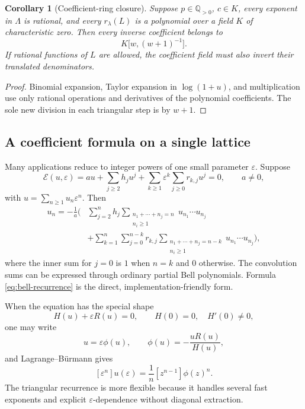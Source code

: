 \documentclass[11pt]{article}
\newtheorem{corollary}[theorem]{Corollary}
\theoremstyle{definition}
\theoremstyle{remark}
\newcommand{\Q}{\mathbb Q}
\newcommand{\calE}{\mathcal E}
\begin{document}
\begin{corollary}[Coefficient-ring closure]\label{cor:coefficient-ring}
Suppose \(p\in\Q_{>0}\), \(c\in K\), every exponent in \(\Lambda\) is rational, and every
\(r_\lambda(L)\) is a polynomial over a field \(K\) of characteristic zero.  Then every inverse coefficient belongs to
\[
 K\bigl[w,(w+1)^{-1}\bigr].
\]
If rational functions of \(L\) are allowed, the coefficient field must also invert their translated denominators.
\end{corollary}

\begin{proof}
Binomial expansion, Taylor expansion in \(\log(1+u)\), and multiplication use only rational operations and derivatives of the polynomial coefficients.  The sole new division in each triangular step is by \(w+1\).
\end{proof}

\subsection{A coefficient formula on a single lattice}

Many applications reduce to integer powers of one small parameter \(\varepsilon\).  Suppose
\begin{equation}\label{eq:single-lattice-E}
 \calE(u,\varepsilon)
 =a u+\sum_{j\ge2}h_j u^j
 +\sum_{k\ge1}\varepsilon^k\sum_{j\ge0}r_{k,j}u^j=0,
 \qquad a\ne0,
\end{equation}
with \(u=\sum_{n\ge1}u_n\varepsilon^n\).  Then
\begin{equation}\label{eq:bell-recurrence}
\begin{split}
 u_n=-\frac1a\Bigg(&
 \sum_{j=2}^{n}h_j
 \sum_{\substack{n_1+\cdots+n_j=n\\n_i\ge1}}
 u_{n_1}\cdots u_{n_j}\\
 &+\sum_{k=1}^{n}\sum_{j=0}^{n-k}r_{k,j}
 \sum_{\substack{n_1+\cdots+n_j=n-k\\n_i\ge1}}
 u_{n_1}\cdots u_{n_j}
 \Bigg),
\end{split}
\end{equation}
where the inner sum for \(j=0\) is \(1\) when \(n=k\) and \(0\) otherwise.  The convolution sums can be expressed through ordinary partial Bell polynomials.  Formula \cref{eq:bell-recurrence} is the direct, implementation-friendly form.

When the equation has the special shape
\[
 H(u)+\varepsilon R(u)=0,
 \qquad H(0)=0,\quad H'(0)\ne0,
\]
one may write
\[
 u=\varepsilon\phi(u),
 \qquad
 \phi(u)=-\frac{uR(u)}{H(u)},
\]
and Lagrange--B\"urmann gives
\begin{equation}\label{eq:lagrange-special}
 [\varepsilon^n]u(\varepsilon)
 =\frac1n[z^{n-1}]\phi(z)^n.
\end{equation}
The triangular recurrence is more flexible because it handles several fast exponents and explicit \(\varepsilon\)-dependence without diagonal extraction.
\end{document}
